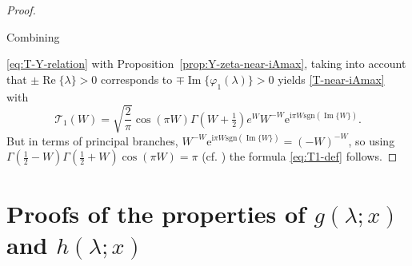\documentclass[12pt]{amsart}
\numberwithin{equation}{section}
\newcommand{\ee}{\mathrm{e}}
\newcommand{\ii}{\mathrm{i}}
\newcommand{\SP}{\lambda}
\DeclareMathOperator{\imag}{Im}
\DeclareMathOperator{\re}{Re}
\begin{document}
\Ttop*

\begin{proof}
\hypertarget{proof:Ttop}{Combining} \eqref{eq:T-Y-relation} with Proposition~\ref{prop:Y-zeta-near-iAmax}, taking into account that $\pm\re\{\SP\}>0$ corresponds to $\mp\imag\{\varphi_1(\SP)\}>0$ yields \eqref{T-near-iAmax} with
\begin{equation}
\mathcal{T}_1(W)=\sqrt{\frac{2}{\pi}}\cos(\pi W)\Gamma(W+\tfrac{1}{2})e^WW^{-W}\ee^{\ii\pi W\mathrm{sgn}(\imag\{W\})}.
\end{equation}
But in terms of principal branches, $W^{-W}\ee^{\ii\pi W\mathrm{sgn}(\imag\{W\})}=(-W)^{-W}$, so using $\Gamma(\tfrac{1}{2}-W)\Gamma(\tfrac{1}{2}+W)\cos(\pi W)=\pi$ (cf. \cite[Eq.~5.5.3]{DLMF}) the formula \eqref{eq:T1-def} follows.
\end{proof}

\section{Proofs of the properties of $g(\SP;x)$ and $h(\SP;x)$}
\label{sec-g-prop}
\gprop*
\end{document}
